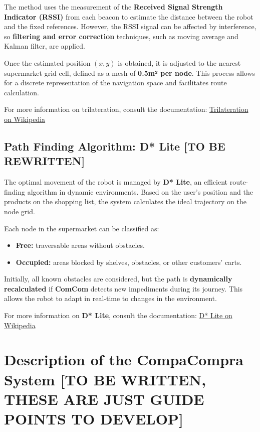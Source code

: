 \documentclass[a4paper,11pt]{article}
\begin{document}
The method uses the measurement of the \textbf{Received Signal Strength Indicator (RSSI)} from each beacon to estimate the distance between the robot and the fixed references. However, the RSSI signal can be affected by interference, so \textbf{filtering and error correction} techniques, such as moving average and Kalman filter, are applied.

Once the estimated position \((x, y)\) is obtained, it is adjusted to the nearest supermarket grid cell, defined as a mesh of \textbf{0.5m² per node}. This process allows for a discrete representation of the navigation space and facilitates route calculation.

For more information on trilateration, consult the documentation:
\href{https://en.wikipedia.org/wiki/Trilateration}{Trilateration on Wikipedia}

\subsection{Path Finding Algorithm: D* Lite [TO BE REWRITTEN]}
The optimal movement of the robot is managed by \textbf{D* Lite}, an efficient route-finding algorithm in dynamic environments. Based on the user's position and the products on the shopping list, the system calculates the ideal trajectory on the node grid.

Each node in the supermarket can be classified as:
\begin{itemize}
\item \textbf{Free:} traversable areas without obstacles.
\item \textbf{Occupied:} areas blocked by shelves, obstacles, or other customers' carts.
\end{itemize}

Initially, all known obstacles are considered, but the path is \textbf{dynamically recalculated} if \textbf{ComCom} detects new impediments during its journey. This allows the robot to adapt in real-time to changes in the environment.

For more information on \textbf{D* Lite}, consult the documentation:
\href{https://en.wikipedia.org/wiki/D*_Lite}{D* Lite on Wikipedia} %

\section{Description of the CompaCompra System [TO BE WRITTEN, THESE ARE JUST GUIDE POINTS TO DEVELOP]}
\end{document}

